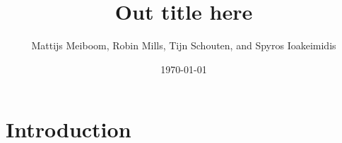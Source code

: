 \documentclass[a4paper, 11pt]{scrartcl}
\title{\Large Out title here}
\author{\small Mattijs Meiboom, Robin Mills, Tijn Schouten, and Spyros Ioakeimidis}
\date{\small \today}
\begin{document}
\maketitle

\thispagestyle{empty}

\section{Introduction}
\end{document}
